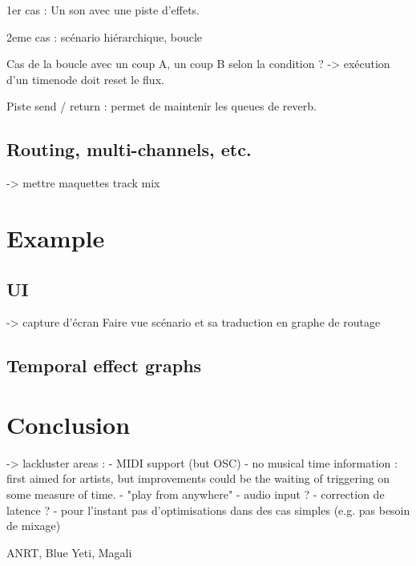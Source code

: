 \documentclass{article}
\begin{document}
1er cas : 
Un son avec une piste d'effets.

2eme cas : scénario hiérarchique, boucle

Cas de la boucle avec un coup A, un coup B selon la condition ? 
-> exécution d'un timenode doit reset le flux.

Piste send / return : permet de maintenir les queues de reverb.


\subsection{Routing, multi-channels, etc.}
-> mettre maquettes track mix

\section{Example}
\subsection{UI}
-> capture d'écran
Faire vue scénario et sa traduction en graphe de routage 

\subsection{Temporal effect graphs}
\section{Conclusion}
-> lackluster areas : 
- MIDI support (but OSC)
- no musical time information : first aimed for artists, 
but improvements could be the waiting of triggering on some measure of time.
- "play from anywhere"
- audio input ?
- correction de latence ?
- pour l'instant pas d'optimisations dans des cas simples (e.g. pas besoin de mixage)
\begin{acknowledgments}
    ANRT, Blue Yeti, Magali
\end{acknowledgments} 


\end{document}
